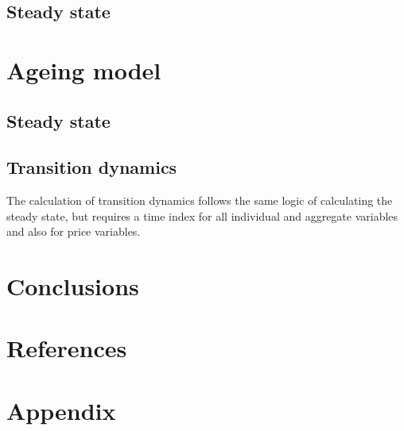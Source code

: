 \documentclass[12pt]{article}
\begin{document}
\subsection{Steady state}

\section{Ageing model}
\subsection{Steady state}

\subsection{Transition dynamics}
The calculation of transition dynamics follows the same logic of calculating the steady state, but requires a time index for all individual and aggregate variables and also for price variables.  

\section{Conclusions}

\section{References}

\section{Appendix}




\end{document}
